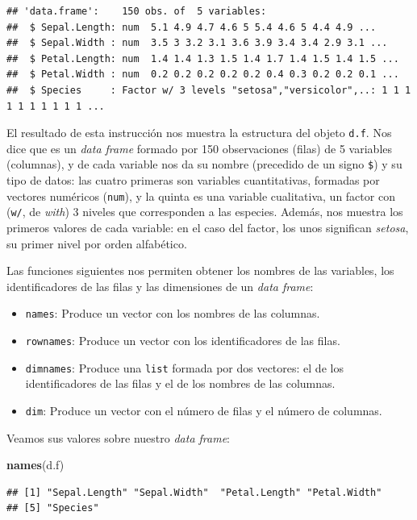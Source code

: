 \documentclass[]{book}
\newenvironment{Shaded}{\begin{snugshade}}{\end{snugshade}}
\newcommand{\KeywordTok}[1]{\textcolor[rgb]{0.13,0.29,0.53}{\textbf{#1}}}
\newcommand{\NormalTok}[1]{#1}
\providecommand{\tightlist}{%
  \setlength{\itemsep}{0pt}\setlength{\parskip}{0pt}}
\theoremstyle{definition}
\theoremstyle{definition}
\theoremstyle{definition}
\theoremstyle{remark}
\begin{document}
\begin{verbatim}
## 'data.frame':    150 obs. of  5 variables:
##  $ Sepal.Length: num  5.1 4.9 4.7 4.6 5 5.4 4.6 5 4.4 4.9 ...
##  $ Sepal.Width : num  3.5 3 3.2 3.1 3.6 3.9 3.4 3.4 2.9 3.1 ...
##  $ Petal.Length: num  1.4 1.4 1.3 1.5 1.4 1.7 1.4 1.5 1.4 1.5 ...
##  $ Petal.Width : num  0.2 0.2 0.2 0.2 0.2 0.4 0.3 0.2 0.2 0.1 ...
##  $ Species     : Factor w/ 3 levels "setosa","versicolor",..: 1 1 1 1 1 1 1 1 1 1 ...
\end{verbatim}

El resultado de esta instrucción nos muestra la estructura del objeto \texttt{d.f}. Nos dice que es un \emph{data frame} formado por 150 observaciones (filas) de 5 variables (columnas), y de cada variable nos da su nombre (precedido de un signo \texttt{\$}) y su tipo de datos: las cuatro primeras son variables cuantitativas, formadas por vectores numéricos (\texttt{num}), y la quinta es una variable cualitativa, un factor con (\texttt{w/}, de \emph{with}) 3 niveles que corresponden a las especies. Además, nos muestra los primeros valores de cada variable: en el caso del factor, los unos significan \emph{setosa}, su primer nivel por orden alfabético.

Las funciones siguientes nos permiten obtener los nombres de las variables, los identificadores de las filas y las dimensiones de un \emph{data frame}:

\begin{itemize}
\tightlist
\item
  \texttt{names}: Produce un vector con los nombres de las columnas.
\item
  \texttt{rownames}: Produce un vector con los identificadores de las filas.
\item
  \texttt{dimnames}: Produce una \texttt{list} formada por dos vectores: el de los identificadores de las filas y el de los nombres de las columnas.
\item
  \texttt{dim}: Produce un vector con el número de filas y el número de columnas.
\end{itemize}

Veamos sus valores sobre nuestro \emph{data frame}:

\begin{Shaded}
\begin{Highlighting}[]
\KeywordTok{names}\NormalTok{(d.f)}
\end{Highlighting}
\end{Shaded}

\begin{verbatim}
## [1] "Sepal.Length" "Sepal.Width"  "Petal.Length" "Petal.Width" 
## [5] "Species"
\end{verbatim}
\end{document}
